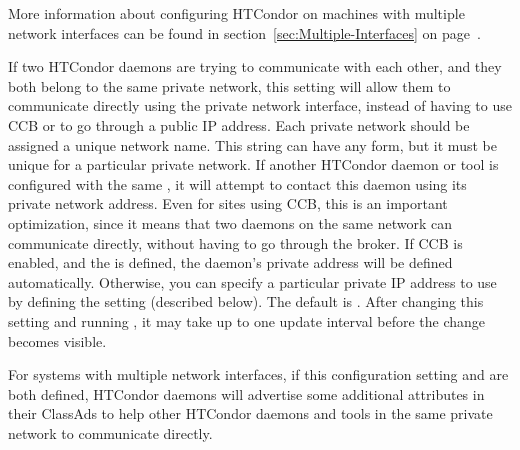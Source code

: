 \begin{description}
  More information about configuring HTCondor on machines with multiple
  network interfaces can be found in
  section~\ref{sec:Multiple-Interfaces} on
  page~\pageref{sec:Multiple-Interfaces}.

\label{param:PrivateNetworkName}
\item[\Macro{PRIVATE\_NETWORK\_NAME}]
  If two HTCondor daemons are trying to communicate with each other, and
  they both belong to the same private network, this setting will
  allow them to communicate directly using the private network
  interface, instead of having to use CCB or to go through a public IP address.
  Each private network should be assigned a unique network name.
  This string can have any form, but it must be unique for a
  particular private network.
  If another HTCondor daemon or tool is configured with the same
  , it will attempt to contact this
  daemon using its private network address.
  Even for sites using CCB, this is an important optimization, since
  it means that two daemons on the same network can communicate
  directly, without having to go through the broker.
  If CCB is enabled, and the  is
  defined, the daemon's private address will be defined automatically.
  Otherwise, you can specify a particular private IP address to use by
  defining the  setting
  (described below).
  The default is .
  After changing this setting and running , it may
  take up to one  update interval before the change becomes visible.

\label{param:PrivateNetworkInterface}
\item[\Macro{PRIVATE\_NETWORK\_INTERFACE}]
  For systems with multiple network interfaces, if this configuration
  setting and  are both defined,
  HTCondor daemons will advertise some additional attributes in their
  ClassAds to help other HTCondor daemons and tools in the same private
  network to communicate directly.


\end{description}
